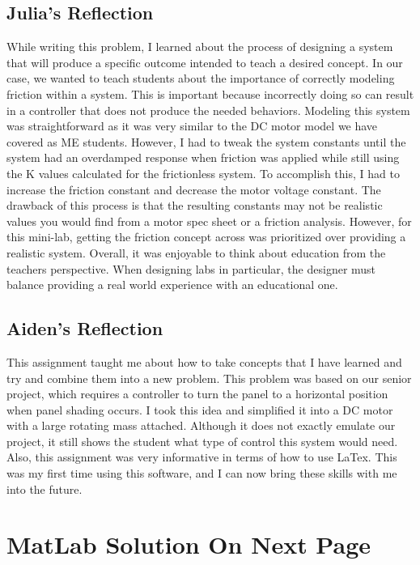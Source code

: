 \documentclass{homework}
\begin{document}
\subsection*{Julia's Reflection}
While writing this problem, I learned about the process of designing a system that will produce a specific outcome intended to teach a desired concept. In our case, we wanted to teach students about the importance of correctly modeling friction within a system. This is important because incorrectly doing so can result in a controller that does not produce the needed behaviors. Modeling this system was straightforward as it was very similar to the DC motor model we have covered as ME students. However, I had to tweak the system constants until the system had an overdamped response when friction was applied while still using the K values calculated for the frictionless system. To accomplish this, I had to increase the friction constant and decrease the motor voltage constant. The drawback of this process is that the resulting constants may not be realistic values you would find from a motor spec sheet or a friction analysis. However, for this mini-lab, getting the friction concept across was prioritized over providing a realistic system. Overall, it was enjoyable to think about education from the teachers perspective. When designing labs in particular, the designer must balance providing a real world experience with an educational one. 

\subsection*{Aiden's Reflection}
This assignment taught me about how to take concepts that I have learned and try and combine them into a new problem. This problem was based on our senior project, which requires a controller to turn the panel to a horizontal position when panel shading occurs. I took this idea and simplified it into a DC motor with a large rotating mass attached. Although it does not exactly emulate our project, it still shows the student what type of control this system would need. Also, this assignment was very informative in terms of how to use LaTex. This was my first time using this software, and I can now bring these skills with me into the future. 

\section*{MatLab Solution On Next Page}
\end{document}
